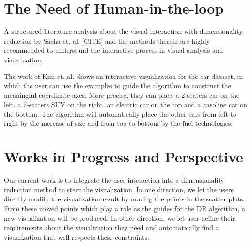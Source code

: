 \section{The Need of Human-in-the-loop}
A structured literature analysis about the visual interaction with dimensionality reduction by Sacha et. al. [CITE] and the methods therein are highly recommended to understand the interactive process in visual analysis and visualization.








The work of Kim et. al. \cite{Kim2016InterAxis} shows an interactive visualization for the car dataset, in which the user can use the examples to guide the algorithm to construct the meaningful coordinate axes.
More precise, they can place a 2-seaters car on the left, a 7-seaters SUV on the right, an electric car on the top and a gasoline car on the bottom. The algorithm will automatically place the other cars from left to right by the increase of size and from top to bottom by the fuel technologies.


\section{Works in Progress and Perspective}

Our current work is to integrate the user interaction into a dimensionality reduction method to steer the visualization.
In one direction, we let the users directly modify the visualization result by moving the points in the scatter plots.
From these moved points which play a role as the guides for the DR algorithm, a new visualization will be produced.
In other direction, we let user define their requirements about the visualization they need and automatically find a visualization that well respects these constraints.

